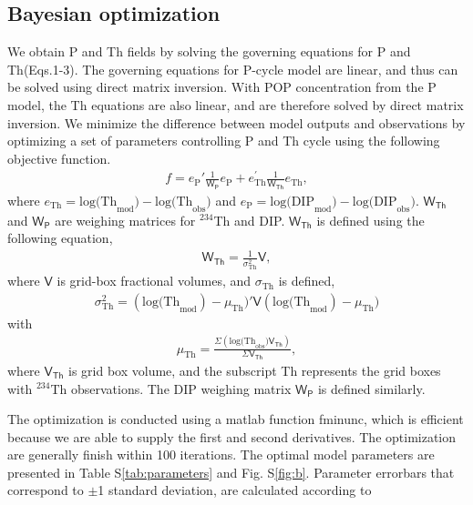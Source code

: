 \subsection{Bayesian optimization}
We obtain P and Th fields by solving the governing equations for P and Th(Eqs.1-3).
The governing equations for P-cycle model are linear, and thus can be solved using direct matrix inversion.
With POP concentration from the P model, the Th equations are also linear, and are therefore solved by direct matrix inversion.
We minimize the difference between model outputs and observations by optimizing a set of parameters controlling P and Th cycle using the following objective function.
\begin{align*}
f = e_{\textrm{P}}{'}\frac{1}{\boldsymbol{\mathsf{W_P}}}e_\textrm{P} + e_{\textrm{Th}}^{'}\frac{1}{\boldsymbol{\mathsf{W_{Th}}}}e_{\textrm{Th}},
\end{align*}
where $ e_{\textrm{Th}} = \textrm{log(Th}_{\textrm{mod}})-\textrm{log(Th}_{\textrm{obs}})$ and $e_{\textrm{P}} = \textrm{log(DIP}_{\textrm{mod}})-\textrm{log(DIP}_{\textrm{obs}})$.
$\boldsymbol{\mathsf{W_{Th}}}$ and $\boldsymbol{\mathsf{W_{P}}}$ are weighing matrices for $^{234}$Th and DIP. $\boldsymbol{\mathsf{W_{Th}}}$ is defined using the following equation,
\begin{align*}
\boldsymbol{\mathsf{W_{Th}}} = \frac{1}{\sigma^2_{\textrm{Th}}}\boldsymbol{\mathsf{V}},
\end{align*}
where $\boldsymbol{\mathsf{V}}$ is grid-box fractional volumes, and $\sigma_{\textrm{Th}}$ is defined,
\begin{align*}
\sigma^2_{\textrm{Th}} = (\textrm{log(Th}_{\textrm{mod}})-\mu_{\textrm{Th}})'\boldsymbol{\mathsf{V}}(\textrm{log(Th}_{\textrm{mod}})-\mu_{\textrm{Th}})
\end{align*}
with
\begin{align*}
\mu_{\textrm{Th}} = \frac{\Sigma({\textrm{log(Th}_{\textrm{obs}})\boldsymbol{\mathsf{V_{Th}}}})}{\Sigma{\boldsymbol{\mathsf{V_{Th}}}}},
\end{align*}
where $\boldsymbol{\mathsf{V_{Th}}}$ is grid box volume, and the subscript Th represents the grid boxes with $^{234}$Th observations.
The DIP weighing matrix $\boldsymbol{\mathsf{W_{P}}}$ is defined similarly.

The optimization is conducted using a matlab function fminunc, which is efficient because we are able to supply the first and second derivatives.
The optimization are generally finish within 100 iterations.
The optimal model parameters are presented in Table S\ref{tab:parameters} and Fig. S\ref{fig:b}.
Parameter errorbars that correspond to $\pm$1 standard deviation, are calculated according to \cite{Wang2019}


